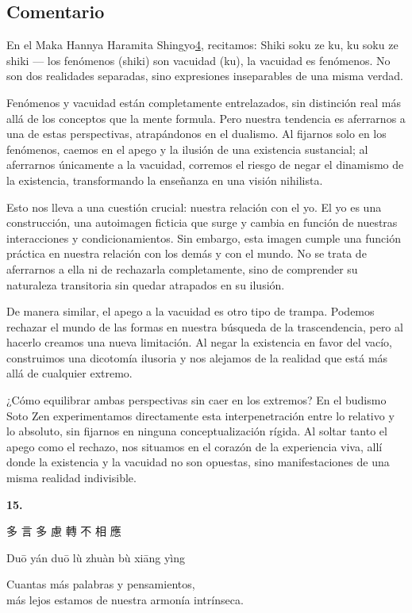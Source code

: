 \documentclass[
  a5paperpaper,
]{article}
\begin{document}
\hfill\break

\hypertarget{comentario-13}{%
\subsection{Comentario}\label{comentario-13}}

En el Maka Hannya Haramita
Shingyo\protect\hypertarget{ref4}{\protect\hyperlink{nota4}{4}},
recitamos: Shiki soku ze ku, ku soku ze shiki --- los fenómenos (shiki)
son vacuidad (ku), la vacuidad es fenómenos. No son dos realidades
separadas, sino expresiones inseparables de una misma verdad.

Fenómenos y vacuidad están completamente entrelazados, sin distinción
real más allá de los conceptos que la mente formula. Pero nuestra
tendencia es aferrarnos a una de estas perspectivas, atrapándonos en el
dualismo. Al fijarnos solo en los fenómenos, caemos en el apego y la
ilusión de una existencia sustancial; al aferrarnos únicamente a la
vacuidad, corremos el riesgo de negar el dinamismo de la existencia,
transformando la enseñanza en una visión nihilista.

Esto nos lleva a una cuestión crucial: nuestra relación con el yo. El yo
es una construcción, una autoimagen ficticia que surge y cambia en
función de nuestras interacciones y condicionamientos. Sin embargo, esta
imagen cumple una función práctica en nuestra relación con los demás y
con el mundo. No se trata de aferrarnos a ella ni de rechazarla
completamente, sino de comprender su naturaleza transitoria sin quedar
atrapados en su ilusión.

De manera similar, el apego a la vacuidad es otro tipo de trampa.
Podemos rechazar el mundo de las formas en nuestra búsqueda de la
trascendencia, pero al hacerlo creamos una nueva limitación. Al negar la
existencia en favor del vacío, construimos una dicotomía ilusoria y nos
alejamos de la realidad que está más allá de cualquier extremo.

¿Cómo equilibrar ambas perspectivas sin caer en los extremos? En el
budismo Soto Zen experimentamos directamente esta interpenetración entre
lo relativo y lo absoluto, sin fijarnos en ninguna conceptualización
rígida. Al soltar tanto el apego como el rechazo, nos situamos en el
corazón de la experiencia viva, allí donde la existencia y la vacuidad
no son opuestas, sino manifestaciones de una misma realidad indivisible.

\hfill\break

\hypertarget{05}{}
\begin{verseblock}

\newpage

\begin{center}\textbf{15.}\end{center}

多 言 多 慮 轉 不 相 應

Duō yán duō lù zhuàn bù xiāng yìng

Cuantas más palabras y pensamientos,\\
más lejos estamos de nuestra armonía intrínseca.

\end{verseblock}
\end{document}
